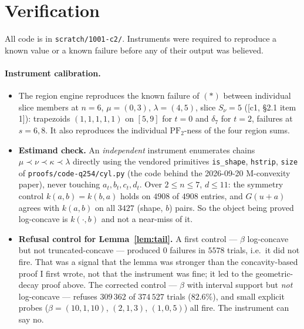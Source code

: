 \documentclass[11pt]{article}
\theoremstyle{definition}
\newcommand{\PFtwo}{\mathrm{PF}_2}
\begin{document}
\section{Verification}\label{sec:verif}

All code is in \verb|scratch/1001-c2/|. Instruments were required to reproduce a known value
or a known failure before any of their output was believed.

\paragraph{Instrument calibration.}
\begin{itemize}
\item The region engine reproduces the known failure of $(*)$ between individual slice
members at $n=6$, $\mu=(0,3)$, $\lambda=(4,5)$, slice $S_\nu=5$ ([c1, §2.1 item 1]):
trapezoids $(1,1,1,1,1)$ on $[5,9]$ for $t=0$ and $\delta_7$ for $t=2$, failures at
$s=6,8$. It also reproduces the individual $\PFtwo$-ness of the four region sums.
\item \textbf{Estimand check.} An \emph{independent} instrument enumerates chains
$\mu\prec\nu\prec\kappa\prec\lambda$ directly using the vendored primitives
\verb|is_shape|, \verb|hstrip|, \verb|size| of \verb|proofs/code-q254/cyl.py| (the code
behind the 2026-09-20 M-convexity paper), never touching $a_t,b_t,c_t,d_t$. Over
$2\le n\le7$, $d\le11$: the symmetry control $k(a,b)=k(b,a)$ holds on $4908$ of $4908$
entries, and $G(u+a)$ agrees with $k(a,b)$ on all $3427$ (shape, $b$) pairs. So the object
being proved log-concave is $k(\cdot,b)$ and not a near-miss of it.
\item \textbf{Refusal control for Lemma~\ref{lem:tail}.} A first control --- $\beta$
log-concave but not truncated-concave --- produced $0$ failures in $5578$ trials, i.e.\ it
did not fire. That was a signal that the lemma was stronger than the concavity-based proof
I first wrote, not that the instrument was fine; it led to the geometric-decay proof above.
The corrected control --- $\beta$ with interval support but \emph{not} log-concave ---
refuses $309\,362$ of $374\,527$ trials ($82.6\%$), and small explicit probes
($\beta=(10,1,10)$, $(2,1,3)$, $(1,0,5)$) all fire. The instrument can say no.
\end{itemize}
\end{document}
